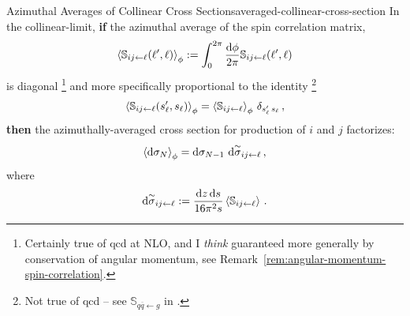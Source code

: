 \begin{lemma}{Azimuthal Averages of Collinear Cross Sections}{averaged-collinear-cross-section}
    In the \gls{collinear-limit}, \textbf{if} the azimuthal average of the spin correlation matrix,
    \begin{align}
        \left\langle\mathbb{S}_{ij \leftarrow \ell}(\ell', \ell)\right\rangle_\phi
        :=
        \int_0^{2\pi}
        \frac{\dd \phi}{2\pi}
        \mathbb{S}_{ij \leftarrow \ell}(\ell', \ell)
    \end{align}
    is diagonal%
    \footnote{
        Certainly true of \gls{qcd} at NLO, and I \textit{think} guaranteed more generally by conservation of angular momentum, see Remark~\ref{rem:angular-momentum-spin-correlation}.
    }
    and more specifically proportional to the identity%
    \footnote{
        Not true of \gls{qcd} -- see \(\mathbb{S}_{q\overline{q}\leftarrow g}\) in .
    }
    \begin{align}
        \left\langle\mathbb{S}_{ij \leftarrow \ell}(s_\ell', s_\ell)\right\rangle_\phi
        =
        \left\langle\mathbb{S}_{ij \leftarrow \ell}\right\rangle_\phi
        \,
        \delta_{s_\ell'\, s_\ell}
        \,,
    \end{align}
    \textbf{then} the azimuthally-averaged cross section for  production of \(i\) and \(j\) factorizes:
    \begin{align}
        \left\langle
        \dd \sigma_N
        \right\rangle_\phi
        =
        \dd \sigma_{N-1}
        \,\,
        \dd \overset{\sim}{\sigma}_{ij\leftarrow \ell}
        \,,
    \end{align}
    where
    \begin{align}
        \dd \overset{\sim}{\sigma}_{ij\leftarrow \ell}
        :=
        \frac{\dd z \, \dd s}{16 \pi^2 s}
        \left\langle\mathbb{S}_{ij\leftarrow \ell}\right\rangle
        \,.
    \end{align}
\end{lemma}

